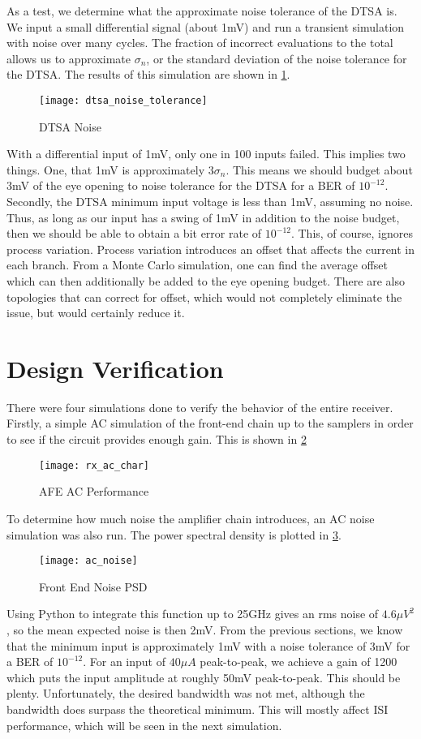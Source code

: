As a test, we determine what the approximate noise tolerance of the DTSA is. We input a small differential signal (about 1mV) and run a transient simulation with noise over many cycles. The fraction of incorrect evaluations to the total allows us to approximate $\sigma_n$, or the standard deviation of the noise tolerance for the DTSA. The results of this simulation are shown in \ref{fig:dtsa_noise}.
\begin{figure}[h]
\centering
\texttt{[image: dtsa\_noise\_tolerance]}
\caption{DTSA Noise}
\label{fig:dtsa_noise}
\end{figure}
With a differential input of 1mV, only one in 100 inputs failed. This implies two things. One, that 1mV is approximately $3\sigma_n$. This means we should budget about 3mV of the eye opening to noise tolerance for the DTSA for a BER of $10^{-12}$. Secondly, the DTSA minimum input voltage is less than 1mV, assuming no noise. Thus, as long as our input has a swing of 1mV in addition to the noise budget, then we should be able to obtain a bit error rate of $10^{-12}$. This, of course, ignores process variation. Process variation introduces an offset that affects the current in each branch. From a Monte Carlo simulation, one can find the average offset which can then additionally be added to the eye opening budget. There are also topologies that can correct for offset, which would not completely eliminate the issue, but would certainly reduce it.
\clearpage
\section{Design Verification}
There were four simulations done to verify the behavior of the entire receiver. Firstly, a simple AC simulation of the front-end chain up to the samplers in order to see if the circuit provides enough gain. This is shown in \ref{fig:afe_ac}
\begin{figure}[h]
\centering
\texttt{[image: rx\_ac\_char]}
\caption{AFE AC Performance}
\label{fig:afe_ac}
\end{figure}
\clearpage
To determine how much noise the amplifier chain introduces, an AC noise simulation was also run. The power spectral density is plotted in \ref{fig:psd}.
\begin{figure}[h]
\centering
\texttt{[image: ac\_noise]}
\caption{Front End Noise PSD}
\label{fig:psd}
\end{figure}

Using Python to integrate this function up to 25GHz gives an rms noise of $4.6\mu V^2$, so the mean expected noise is then 2mV.
\clearpage
From the previous sections, we know that the minimum input is approximately 1mV with a noise tolerance of 3mV for a BER of $10^{-12}$. For an input of $40\mu A$ peak-to-peak, we achieve a gain of 1200 which puts the input amplitude at roughly 50mV peak-to-peak. This should be plenty. Unfortunately, the desired bandwidth was not met, although the bandwidth does surpass the theoretical minimum. This will mostly affect ISI performance, which will be seen in the next simulation.

